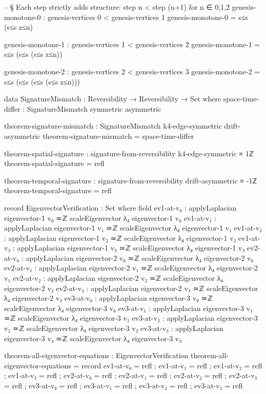 \documentclass[11pt,a4paper]{book}
\begin{document}
\begin{code}
-- § Each step strictly adds structure: step n < step (n+1) for n ∈ {0,1,2}
genesis-monotone-0 : genesis-vertices 0 < genesis-vertices 1
genesis-monotone-0 = s≤s (s≤s z≤n)

genesis-monotone-1 : genesis-vertices 1 < genesis-vertices 2
genesis-monotone-1 = s≤s (s≤s (s≤s z≤n))

genesis-monotone-2 : genesis-vertices 2 < genesis-vertices 3
genesis-monotone-2 = s≤s (s≤s (s≤s (s≤s z≤n)))

data SignatureMismatch : Reversibility → Reversibility → Set where
  space-time-differ : SignatureMismatch symmetric asymmetric

theorem-signature-mismatch : SignatureMismatch k4-edge-symmetric drift-asymmetric
theorem-signature-mismatch = space-time-differ

theorem-spatial-signature : signature-from-reversibility k4-edge-symmetric ≡ 1ℤ
theorem-spatial-signature = refl

theorem-temporal-signature : signature-from-reversibility drift-asymmetric ≡ -1ℤ
theorem-temporal-signature = refl

record EigenvectorVerification : Set where
  field
    ev1-at-v₀ : applyLaplacian eigenvector-1 v₀ ≃ℤ scaleEigenvector λ₄ eigenvector-1 v₀
    ev1-at-v₁ : applyLaplacian eigenvector-1 v₁ ≃ℤ scaleEigenvector λ₄ eigenvector-1 v₁
    ev1-at-v₂ : applyLaplacian eigenvector-1 v₂ ≃ℤ scaleEigenvector λ₄ eigenvector-1 v₂
    ev1-at-v₃ : applyLaplacian eigenvector-1 v₃ ≃ℤ scaleEigenvector λ₄ eigenvector-1 v₃
    ev2-at-v₀ : applyLaplacian eigenvector-2 v₀ ≃ℤ scaleEigenvector λ₄ eigenvector-2 v₀
    ev2-at-v₁ : applyLaplacian eigenvector-2 v₁ ≃ℤ scaleEigenvector λ₄ eigenvector-2 v₁
    ev2-at-v₂ : applyLaplacian eigenvector-2 v₂ ≃ℤ scaleEigenvector λ₄ eigenvector-2 v₂
    ev2-at-v₃ : applyLaplacian eigenvector-2 v₃ ≃ℤ scaleEigenvector λ₄ eigenvector-2 v₃
    ev3-at-v₀ : applyLaplacian eigenvector-3 v₀ ≃ℤ scaleEigenvector λ₄ eigenvector-3 v₀
    ev3-at-v₁ : applyLaplacian eigenvector-3 v₁ ≃ℤ scaleEigenvector λ₄ eigenvector-3 v₁
    ev3-at-v₂ : applyLaplacian eigenvector-3 v₂ ≃ℤ scaleEigenvector λ₄ eigenvector-3 v₂
    ev3-at-v₃ : applyLaplacian eigenvector-3 v₃ ≃ℤ scaleEigenvector λ₄ eigenvector-3 v₃

theorem-all-eigenvector-equations : EigenvectorVerification
theorem-all-eigenvector-equations = record
  { ev1-at-v₀ = refl
  ; ev1-at-v₁ = refl
  ; ev1-at-v₂ = refl
  ; ev1-at-v₃ = refl
  ; ev2-at-v₀ = refl
  ; ev2-at-v₁ = refl
  ; ev2-at-v₂ = refl
  ; ev2-at-v₃ = refl
  ; ev3-at-v₀ = refl
  ; ev3-at-v₁ = refl
  ; ev3-at-v₂ = refl
  ; ev3-at-v₃ = refl
  }



\end{code}
\end{document}
